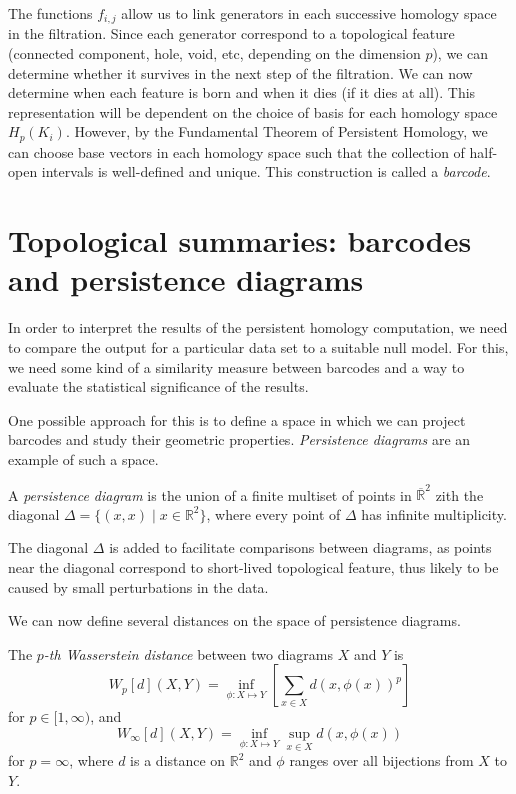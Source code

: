 \documentclass[a4paper,11pt,openany,extrafontsizes]{memoir}
\begin{document}
The functions $f_{i,j}$ allow us to link generators in each successive
homology space in the filtration. Since each generator correspond to a
topological feature (connected component, hole, void, etc, depending
on the dimension $p$), we can determine whether it survives in the
next step of the filtration. We can now determine when each feature is
born and when it dies (if it dies at all). This representation will be
dependent on the choice of basis for each homology space
$H_p(K_i)$. However, by the Fundamental Theorem of Persistent
Homology, we can choose base vectors in each homology space such that
the collection of half-open intervals is well-defined and unique. This
construction is called a \emph{barcode}.

\section{Topological summaries: barcodes and persistence diagrams}%
\label{sec:topol-summ}

In order to interpret the results of the persistent homology
computation, we need to compare the output for a particular data set
to a suitable null model. For this, we need some kind of a similarity
measure between barcodes and a way to evaluate the statistical
significance of the results.

One possible approach for this is to define a space in which we can
project barcodes and study their geometric
properties. \emph{Persistence diagrams} are an example of such a
space.

\begin{defn}
  A \emph{persistence diagram} is the union of a finite multiset of
  points in $\overline{\mathbb{R}}^2$ zith the diagonal
  $\Delta = \{(x,x) \;|\; x\in\mathbb{R}^2\}$, where every point of
  $\Delta$ has infinite multiplicity.
\end{defn}

The diagonal $\Delta$ is added to facilitate comparisons between
diagrams, as points near the diagonal correspond to short-lived
topological feature, thus likely to be caused by small perturbations
in the data.

We can now define several distances on the space of persistence
diagrams.

\begin{defn}
  The \emph{$p$-th Wasserstein distance} between two diagrams $X$ and
  $Y$ is
  \[ W_p[d](X, Y) = \inf_{\phi:X\mapsto Y} \left[\sum_{x\in X} {d\left(x, \phi(x)\right)}^p\right] \]
  for $p\in [1,\infty)$, and
  \[ W_\infty[d](X, Y) = \inf_{\phi:X\mapsto Y} \sup_{x\in X} d\left(x,
      \phi(x)\right) \] for $p = \infty$, where $d$ is a distance on
  $\mathbb{R}^2$ and $\phi$ ranges over all bijections from $X$ to
  $Y$.
\end{defn}
\end{document}
